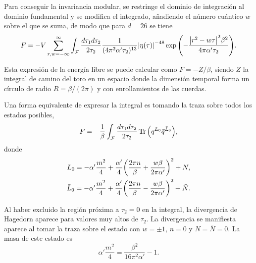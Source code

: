 Para conseguir la invariancia modular, se restringe el dominio de integración al dominio
fundamental y se modifica el integrado, añadiendo el número cuántico $w$ sobre el que 
se suma, de modo que para $d=26$ se tiene
\begin{equation}
  F=-V \sum_{r,w=-\infty}^{\infty} \int_\mathcal{F}  \frac{d\tau_1d\tau_2}{2\tau_2}   \frac{1}{(4\pi^2\alpha'\tau_2)^{13}}
  \abs{\eta(\tau)}^{-48}\exp\qty(-\frac{\abs{r^2-w\tau}^2\beta^2}{4\pi\alpha'\tau_2}).
  \label{eq:fund}
\end{equation}

Esta expresión de la energía libre se puede calcular como $F=-Z/\beta$, siendo $Z$ la integral de camino del toro en
un espacio donde la dimensión temporal forma un círculo de radio $R=\beta/(2\pi)$ y con enrollamientos
de las cuerdas.

Una forma equivalente de expresar la integral es tomando la traza sobre todos los estados posibles,
\begin{equation}
  F =-\frac{1}{\beta} \int_{\mathcal F} \frac{d\tau_1 d\tau_2}{2\tau_2} \Tr\qty(q^{L_0} \bar q^{\bar L_0}),
\end{equation}
donde 
\begin{equation}
  \begin{gathered}
         L_0 =  -\alpha'\frac{m^2}{4} + \frac{\alpha'}{4}\qty(\frac{2\pi n}{\beta} + \frac{w\beta}{2\pi\alpha'})^2 + N,\\
    \bar L_0 =  -\alpha'\frac{m^2}{4} + \frac{\alpha'}{4}\qty(\frac{2\pi n}{\beta} - \frac{w\beta}{2\pi\alpha'})^2 +\bar N.
  \end{gathered}
\end{equation}

Al haber excluido la región próxima a $\tau_2=0$ en la integral, la divergencia de Hagedorn aparece para
valores muy altos de $\tau_2$.
La divergencia se manifiesta aparece al tomar la traza sobre el estado con $w=\pm 1$, $n=0$ y $N=\bar N=0$.
La masa de este estado es
\begin{equation}
  \alpha' \frac{m^2}{4} = \frac{\beta^2}{16\pi^2\alpha'} -1.
\end{equation}


%
%

